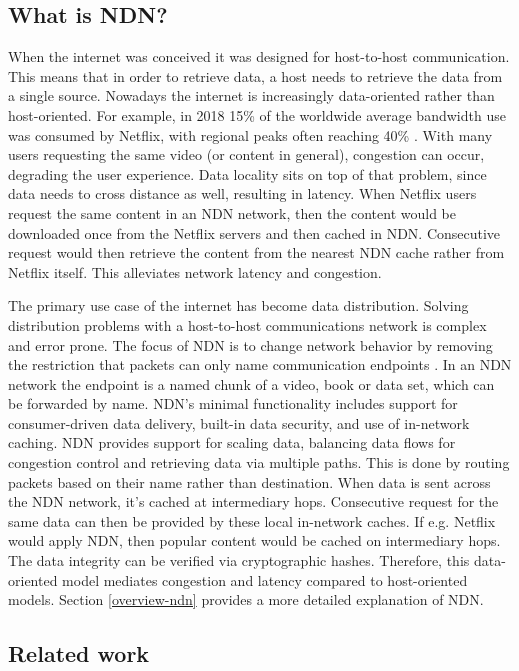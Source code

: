 \subsection{What is NDN?}
\label{introduction-ndn}
When the internet was conceived it was designed for host-to-host communication. This means that in order to retrieve data, a host needs to retrieve the data from a single source. Nowadays the internet is increasingly data-oriented rather than host-oriented. For example, in 2018 15\% of the worldwide average bandwidth use was consumed by Netflix, with regional peaks often reaching 40\% \cite{introduction-netflix}. With many users requesting the same video (or content in general), congestion can occur, degrading the user experience. Data locality sits on top of that problem, since data needs to cross distance as well, resulting in latency. When Netflix users request the same content in an NDN network, then the content would be downloaded once from the Netflix servers and then cached in NDN. Consecutive request would then retrieve the content from the nearest NDN cache rather from Netflix itself. This alleviates network latency and congestion.

The primary use case of the internet has become data distribution. Solving distribution problems with a host-to-host communications network is complex and error prone. The focus of NDN is to change network behavior by removing the restriction that packets can only name communication endpoints \cite{ndn-summary}. In an NDN network the endpoint is a named chunk of a video, book or data set, which can be forwarded by name. NDN’s minimal functionality includes support for consumer-driven data delivery, built-in data security, and use of in-network caching. NDN provides support for scaling data, balancing data flows for congestion control and retrieving data via multiple paths. This is done by routing packets based on their name rather than destination. When data is sent across the NDN network, it's cached at intermediary hops. Consecutive request for the same data can then be provided by these local in-network caches. If e.g. Netflix would apply NDN, then popular content would be cached on intermediary hops. The data integrity can be verified via cryptographic hashes. Therefore, this data-oriented model mediates congestion and latency compared to host-oriented models. Section \ref{overview-ndn} provides a more detailed explanation of NDN.

\subsection{Related work}
\label{introduction-related-work}


